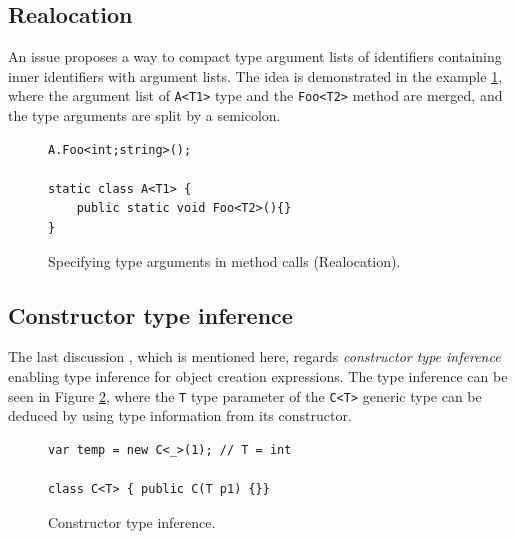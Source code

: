 \subsection{Realocation}

An issue \cite{online:Realloc} proposes a way to compact type argument lists of identifiers containing inner identifiers with argument lists. 
The idea is demonstrated in the example \ref{img25:Realloc}, where the argument list of \texttt{A<T1>} type and the \texttt{Foo<T2>} method are merged, and the type arguments are split by a semicolon.
\begin{figure}[h]
\begin{lstlisting}[style=csharp]
A.Foo<int;string>();

static class A<T1> {
    public static void Foo<T2>(){}
}
\end{lstlisting}
\caption{Specifying type arguments in method calls (Realocation).}
\label{img25:Realloc}
\end{figure}

\subsection{Constructor type inference}

The last discussion \cite{online:CtorTInf}, which is mentioned here, regards \textit{constructor type inference} enabling type inference for object creation expressions. 
The type inference can be seen in Figure \ref{img26:CtorTInf}, where the \texttt{T} type parameter of the \texttt{C<T>} generic type can be deduced by using type information from its constructor.
\begin{figure}[h]
\begin{lstlisting}[style=csharp]
var temp = new C<_>(1); // T = int

class C<T> { public C(T p1) {}}
\end{lstlisting}
\caption{Constructor type inference.}
\label{img26:CtorTInf}
\end{figure}